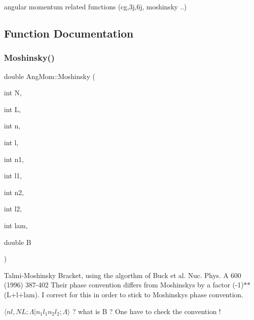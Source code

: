 angular momentum related functions (cg,3j,6j, moshinsky ..) 

\subsection{Function Documentation}
\mbox{\label{namespaceAngMom_a3817ffc350f81e74b8efe074616b61b8}} 
\subsubsection{\texorpdfstring{Moshinsky()}{Moshinsky()}}
{\footnotesize\ttfamily double Ang\+Mom\+::\+Moshinsky (\begin{DoxyParamCaption}\item[{int}]{N,  }\item[{int}]{L,  }\item[{int}]{n,  }\item[{int}]{l,  }\item[{int}]{n1,  }\item[{int}]{l1,  }\item[{int}]{n2,  }\item[{int}]{l2,  }\item[{int}]{lam,  }\item[{double}]{B }\end{DoxyParamCaption})}

Talmi-\/\+Moshinsky Bracket, using the algorthm of Buck et al. Nuc. Phys. A 600 (1996) 387-\/402 Their phase convention differs from Moshinsky\textquotesingle{}s by a factor (-\/1)$\ast$$\ast$(L+l+lam). I correct for this in order to stick to Moshinsky\textquotesingle{}s phase convention.

$ \langle n l, N L; \Lambda | n_1 l_1 n_2 l_2;\Lambda\rangle $ ? what is B ? One have to check the convention ! 